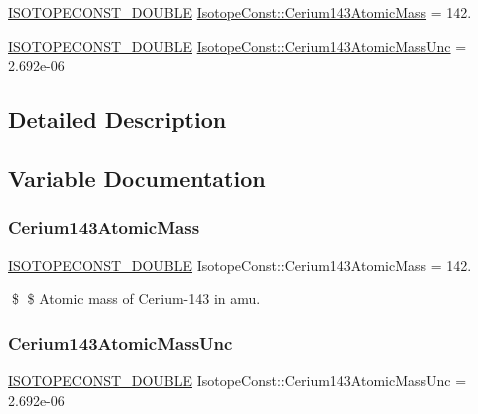 \begin{DoxyCompactItemize}
\item 
\mbox{\hyperlink{group___isotope_const-_macros_ga8f45a7272ce02c0b4c65c44636ed719a}{I\+S\+O\+T\+O\+P\+E\+C\+O\+N\+S\+T\+\_\+\+D\+O\+U\+B\+LE}} \mbox{\hyperlink{group___isotope_const-_cerium-_ce143_ga4572b413fad50e172042b395aeaded9a}{Isotope\+Const\+::\+Cerium143\+Atomic\+Mass}} = 142.
\item 
\mbox{\hyperlink{group___isotope_const-_macros_ga8f45a7272ce02c0b4c65c44636ed719a}{I\+S\+O\+T\+O\+P\+E\+C\+O\+N\+S\+T\+\_\+\+D\+O\+U\+B\+LE}} \mbox{\hyperlink{group___isotope_const-_cerium-_ce143_ga486f8afa6817ada55e2cbd35409d4c89}{Isotope\+Const\+::\+Cerium143\+Atomic\+Mass\+Unc}} = 2.\+692e-\/06
\end{DoxyCompactItemize}


\subsection{Detailed Description}


\subsection{Variable Documentation}
\mbox{\label{group___isotope_const-_cerium-_ce143_ga4572b413fad50e172042b395aeaded9a}} 
\subsubsection{\texorpdfstring{Cerium143\+Atomic\+Mass}{Cerium143AtomicMass}}
{\footnotesize\ttfamily \mbox{\hyperlink{group___isotope_const-_macros_ga8f45a7272ce02c0b4c65c44636ed719a}{I\+S\+O\+T\+O\+P\+E\+C\+O\+N\+S\+T\+\_\+\+D\+O\+U\+B\+LE}} Isotope\+Const\+::\+Cerium143\+Atomic\+Mass = 142.}

\$ \$ Atomic mass of Cerium-\/143 in amu. \mbox{\label{group___isotope_const-_cerium-_ce143_ga486f8afa6817ada55e2cbd35409d4c89}} 
\subsubsection{\texorpdfstring{Cerium143\+Atomic\+Mass\+Unc}{Cerium143AtomicMassUnc}}
{\footnotesize\ttfamily \mbox{\hyperlink{group___isotope_const-_macros_ga8f45a7272ce02c0b4c65c44636ed719a}{I\+S\+O\+T\+O\+P\+E\+C\+O\+N\+S\+T\+\_\+\+D\+O\+U\+B\+LE}} Isotope\+Const\+::\+Cerium143\+Atomic\+Mass\+Unc = 2.\+692e-\/06}

